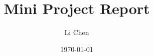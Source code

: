 \documentclass{report}
\title{Mini Project Report}
\author{Li Chen}
\date{\today}
\begin{document}
\newpage

\maketitle

\newpage

\renewcommand{\contentsname}{Table of Content}
\tableofcontents


\begin{spacing}{1.5}









\end{spacing}

\end{document}

